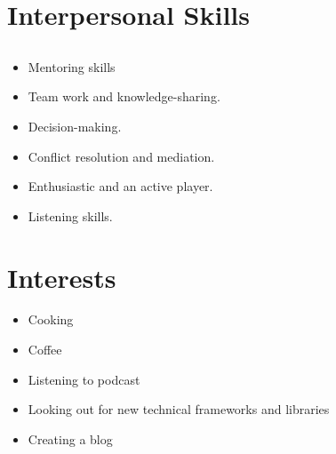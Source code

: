 \documentclass[letterpaper]{twentysecondcv} %
\begin{document}
\section{Interpersonal Skills}

\subsection{}{
	\begin{itemize}
		\item Mentoring skills 
		\item Team work and knowledge-sharing.
		\item Decision-making.
		\item Conflict resolution and mediation.
		\item Enthusiastic and an active player.
		\item Listening skills.
	\end{itemize}
}

\section{Interests}
\begin{itemize}
	\item Cooking
	\item Coffee
	\item Listening to podcast
	\item Looking out for new technical frameworks and libraries
	\item Creating a blog
\end{itemize}
\end{document}
